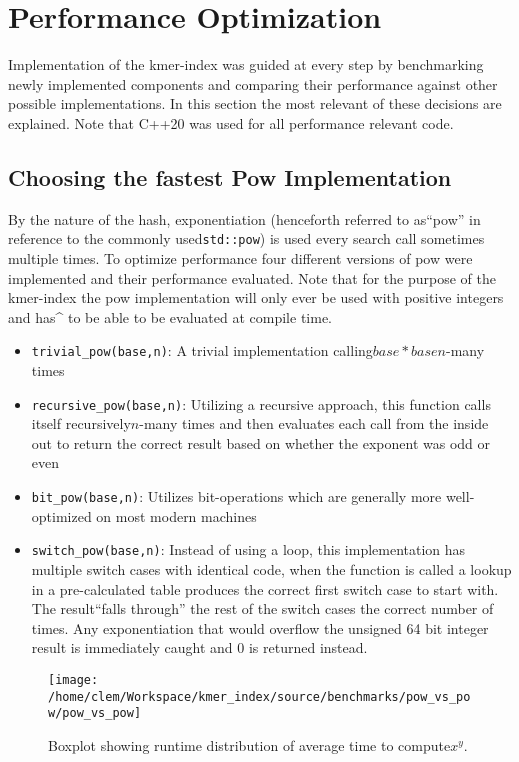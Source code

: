 \section{Performance Optimization}

Implementation of the kmer-index was guided at every step by benchmarking
newly implemented components and comparing their performance against
other possible implementations. In this section the most relevant
of these decisions are explained. Note that C++20 was used for all
performance relevant code.

\subsection{Choosing the fastest Pow Implementation}

By the nature of the hash, exponentiation (henceforth referred to
as``pow'' in reference to the commonly used\lstinline{std::pow})
is used every search call sometimes multiple times. To optimize performance
four different versions of pow were implemented and their performance
evaluated. Note that for the purpose of the kmer-index the pow implementation
will only ever be used with positive integers and has\textasciicircum{}
to be able to be evaluated at compile time.
\begin{itemize}
\item \lstinline{trivial_pow(base,n)}: A trivial implementation calling$base*base$$n$-many
times
\item \lstinline{recursive_pow(base,n)}: Utilizing a recursive approach,
this function calls itself recursively$n$-many times and then evaluates
each call from the inside out to return the correct result based on
whether the exponent was odd or even
\item \lstinline{bit_pow(base,n)}: Utilizes bit-operations which are generally
more well-optimized on most modern machines
\item \lstinline{switch_pow(base,n)}: Instead of using a loop, this implementation
has multiple switch cases with identical code, when the function is
called a lookup in a pre-calculated table produces the correct first
switch case to start with. The result``falls through'' the rest
of the switch cases the correct number of times. Any exponentiation
that would overflow the unsigned 64 bit integer result is immediately
caught and 0 is returned instead.
\end{itemize}
\begin{figure}[H]
\textasciiacute \texttt{[image: /home/clem/Workspace/kmer\_index/source/benchmarks/pow\_vs\_pow/pow\_vs\_pow]}

\caption{Boxplot showing runtime distribution of average time to compute$x^{y}$.}
\end{figure}

